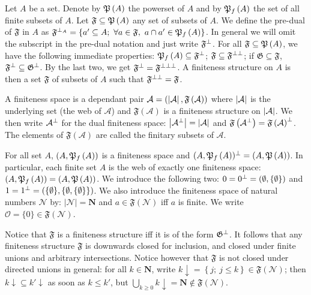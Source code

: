 Let \(A\) be a set. Denote by \(\mathfrak{P}\left(A\right)\) the powerset of \(A\) and
by \(\mathfrak{P}_f\left(A\right)\) the set of all finite subsets of \(A\). Let
\({\mathfrak F} \subseteq \mathfrak{P}\left(A\right)\) any set of subsets of \(A\). We
define the pre-dual of \({\mathfrak F}\) in \(A\) as
\({\mathfrak F}^{\bot_{A}}=\left\{a'\subseteq A;\ \forall a\in{\mathfrak F},\ a\cap a'\in\mathfrak{P}_f\left(A\right)\right\}\).
In general we will omit the subscript in the pre-dual notation and just
write \({\mathfrak F}^\bot\). For all
\({\mathfrak F}\subseteq\mathfrak{P}\left(A\right)\), we have the following immediate
properties: \(\mathfrak{P}_f\left(A\right)\subseteq {\mathfrak F}^\bot\);
\({\mathfrak F}\subseteq {\mathfrak F}^{\bot\bot}\); if
\({\mathfrak G}\subseteq{\mathfrak F}\),
\({\mathfrak F}^\bot\subseteq {\mathfrak G}^\bot\). By the last two, we
get \({\mathfrak F}^\bot = {\mathfrak F}^{\bot\bot\bot}\). A finiteness
structure on \(A\) is then a set \({\mathfrak F}\) of subsets of \(A\)
such that \({\mathfrak F}^{\bot\bot} = {\mathfrak F}\).

A finiteness space is a dependant pair
\({\mathcal A}=\left(\left|\mathcal A\right|,\mathfrak F\left(\mathcal A\right)\right)\)
where \(\left|\mathcal A\right|\) is the underlying set (the web of
\({\mathcal A}\)) and \(\mathfrak F\left(\mathcal A\right)\) is a
finiteness structure on \(\left|\mathcal A\right|\). We then write
\({\mathcal A}^\bot\) for the dual finiteness space:
\(\left|{\mathcal A}^\bot\right| = \left|\mathcal A\right|\) and
\(\mathfrak F\left({\mathcal A}^\bot\right)=\mathfrak F\left({\mathcal A}\right)^{\bot}\).
The elements of \(\mathfrak F\left(\mathcal A\right)\) are called the
finitary subsets of \({\mathcal A}\).

\begin{example}\label{example.}
For all set \(A\), \((A,\mathfrak{P}_f\left(A\right))\) is a finiteness space and \((A,\mathfrak{P}_f\left(A\right))^\bot = (A,\mathfrak{P}\left(A\right))\). In particular, each finite set \(A\) is the web of exactly one finiteness space: \((A,\mathfrak{P}_f\left(A\right))=(A,\mathfrak{P}\left(A\right))\). We introduce the following two: \(0 = 0^\bot = \left(\emptyset, \{\emptyset\}\right)\) and \(1 = 1^\bot = \left(\{\emptyset\}, \{\emptyset, \{\emptyset\}\}\right)\). We also introduce the finiteness space of natural numbers \({\mathcal N}\) by: \(|{\mathcal N}|={\mathbf N}\) and \(a\in\mathfrak F\left(\mathcal N\right)\) iff \(a\) is finite. We write \(\mathcal O=\{0\}\in\mathfrak F\left({\mathcal N}\right)\).

Notice that \({\mathfrak F}\) is a finiteness structure iff it is of the
form \({\mathfrak G}^\bot\). It follows that any finiteness structure
\({\mathfrak F}\) is downwards closed for inclusion, and closed under
finite unions and arbitrary intersections. Notice however that
\({\mathfrak F}\) is not closed under directed unions in general: for
all \(k\in{\mathbf N}\), write
\(k{\downarrow}=\left\{j;\  j\le k\right\}\in\mathfrak F\left({\mathcal N}\right)\);
then \(k{\downarrow}\subseteq k'{\downarrow}\) as soon as \(k\le k'\),
but
\(\bigcup_{k\ge0} k{\downarrow}={\mathbf N}\not\in\mathfrak F\left({\mathcal N}\right)\).
\end{example}

